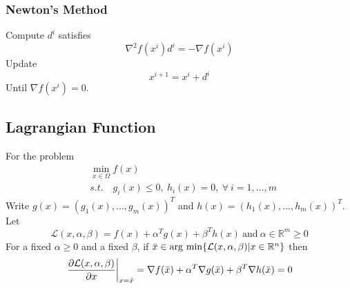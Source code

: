 \documentclass{article}
\DeclareMathOperator*{\argmin}{arg~min}
\begin{document}
            \subsubsection{Newton's Method}
                Compute $d^i$ satisfies
                \[
                    \nabla^2 f(x^i)d^i = -\nabla f(x^i)
                \]
                Update
                \[
                    x^{i+1} = x^i + d^i
                \]
                Until $\nabla f(x^i)=0$.
        \subsection{Lagrangian Function}
            For the problem
            \begin{align*}
                &\min_{x\in\Omega} f(x)\\
                &s.t.\quad g_i(x)\leq 0,~h_i(x)=0,~\forall~i=1,\dots,m
            \end{align*}
            Write $g(x)=(g_1(x),\dots,g_m(x))^T$ and $h(x)=(h_1(x),\dots,h_m(x))^T$.
            Let 
            \[
                \mathcal{L}(x,\alpha,\beta)=f(x)+\alpha^Tg(x)+\beta^Th(x) \mathrm{~and~} \alpha\in\mathbb{R}^m\geq 0
            \]
            For a fixed $\alpha\geq 0$ and a fixed $\beta$, if $\Bar{x}\in\argmin\{\mathcal{L}(x,\alpha,\beta)|x\in\mathbb{R}^n\}$ then
            \[
                \left.\frac{\partial\mathcal{L}(x,\alpha,\beta)}{\partial x}\right|_{x=\Bar{x}}=\nabla f(\Bar{x}) + \alpha^T\nabla g(\Bar{x})+\beta^T\nabla h(\Bar{x})=0
            \]
            
\end{document}
